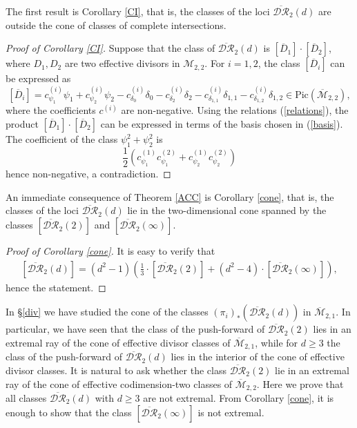 \documentclass[10pt]{amsart}
\theoremstyle{definition}
\begin{document}
The first result is Corollary \ref{CI}, that is, the classes of the loci $\overline{\mathcal{DR}}_2(d)$ are outside the cone of classes of complete intersections.

\begin{proof}[Proof of Corollary \ref{CI}]
Suppose that the class of $\overline{\mathcal{DR}}_2(d)$ is $\left[\overline{D}_1 \right]\cdot \left[\overline{D}_2 \right]$, where $D_1, D_2$ are two effective divisors in ${\mathcal{M}}_{2,2}$. For $i=1,2$, the class $\left[\overline{D}_i \right]$ can be expressed as
\[
 \left[\overline{D}_i \right] = c^{(i)}_{\psi_1} \psi_1 + c^{(i)}_{\psi_2} \psi_2 - c^{(i)}_{\delta_0} \delta_0 - c^{(i)}_{\delta_2}\delta_2 - c^{(i)}_{\delta_{1,1}}\delta_{1,1} - c^{(i)}_{\delta_{1,2}}\delta_{1,2} \in
\textrm{Pic}({\overline{\mathcal{M}}}_{2,2}),
\]
where the coefficients $c^{(i)}$ are non-negative. Using the relations (\ref{relations}), the product $\left[\overline{D}_1 \right]\cdot \left[\overline{D}_2 \right]$ can be expressed in terms of the basis chosen in (\ref{basis}). The coefficient of the class $\psi_1^2+\psi_2^2$ is 
\[
\frac{1}{2}\left(c^{(1)}_{\psi_1}c^{(2)}_{\psi_1}+c^{(1)}_{\psi_2}c^{(2)}_{\psi_2} \right)
\]
hence non-negative, a contradiction.
\end{proof}

An immediate consequence of Theorem \ref{ACC} is Corollary \ref{cone}, that is, the classes of the loci $\overline{\mathcal{DR}}_2(d)$ lie in the two-dimensional cone spanned by the classes 
$\left[\overline{\mathcal{DR}}_2(2)\right]$ and $\left[\overline{\mathcal{DR}}_2(\infty)\right]$.

\begin{proof}[Proof of Corollary \ref{cone}]
It is easy to verify that
\begin{eqnarray}
\label{2dimcone}
 \left[\overline{\mathcal{DR}}_2(d)\right] = (d^2-1)\left(\frac{1}{3}\cdot\left[\overline{\mathcal{DR}}_2(2)\right] + (d^2-4)\cdot\left[\overline{\mathcal{DR}}_2(\infty)\right] \right),
\end{eqnarray}
hence the statement.
\end{proof}

In \S\ref{div} we have studied the cone of the classes $(\pi_i)_*\left(\overline{\mathcal{DR}}_2(d)\right)$ in ${\overline{\mathcal{M}}}_{2,1}$. In particular, we have seen that the class of the push-forward of $\overline{\mathcal{DR}}_2(2)$ lies in an extremal ray of the cone of effective divisor classes of ${\overline{\mathcal{M}}}_{2,1}$, while for $d\geq 3$ the class of the push-forward of $\overline{\mathcal{DR}}_2(d)$ lies in the interior of the cone of effective divisor classes.
It is natural to ask whether the class $\overline{\mathcal{DR}}_2(2)$ lie in an extremal ray of the cone of effective codimension-two classes of ${\overline{\mathcal{M}}}_{2,2}$. Here we prove that all classes $\overline{\mathcal{DR}}_2(d)$ with $d\geq 3$ are not extremal.
From Corollary \ref{cone}, it is enough to show that the class $\left[\overline{\mathcal{DR}}_2(\infty)\right]$ is not extremal.
\end{document}
